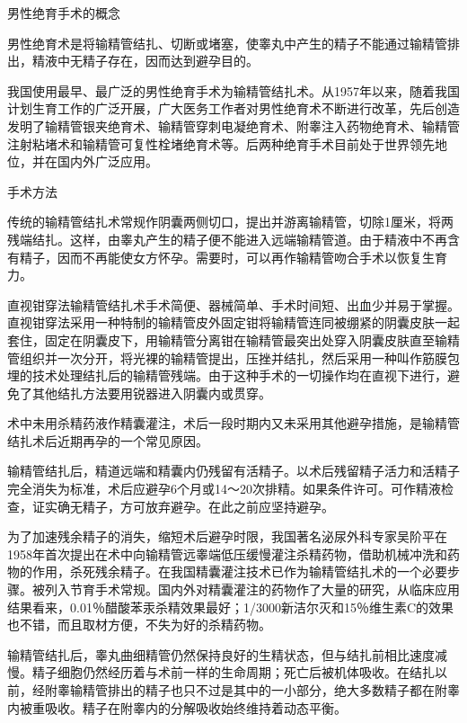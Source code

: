 \documentclass[12pt,UTF8,openany]{ctexbook}
\begin{document}
男性绝育手术的概念


男性绝育术是将输精管结扎、切断或堵塞，使睾丸中产生的精子不能通过输精管排出，精液中无精子存在，因而达到避孕目的。

我国使用最早、最广泛的男性绝育手术为输精管结扎术。从1957年以来，随着我国计划生育工作的广泛开展，广大医务工作者对男性绝育术不断进行改革，先后创造发明了输精管银夹绝育术、输精管穿刺电凝绝育术、附睾注入药物绝育术、输精管注射粘堵术和输精管可复性栓堵绝育术等。后两种绝育手术目前处于世界领先地位，并在国内外广泛应用。





手术方法


传统的输精管结扎术常规作阴囊两侧切口，提出并游离输精管，切除1厘米，将两残端结扎。这样，由睾丸产生的精子便不能进入远端输精管道。由于精液中不再含有精子，因而不再能使女方怀孕。需要时，可以再作输精管吻合手术以恢复生育力。

直视钳穿法输精管结扎术手术简便、器械简单、手术时间短、出血少并易于掌握。直视钳穿法采用一种特制的输精管皮外固定钳将输精管连同被绷紧的阴囊皮肤一起套住，固定在阴囊皮下，用输精管分离钳在输精管最突出处穿入阴囊皮肤直至输精管组织并一次分开，将光裸的输精管提出，压挫并结扎，然后采用一种叫作筋膜包埋的技术处理结扎后的输精管残端。由于这种手术的一切操作均在直视下进行，避免了其他结扎方法要用锐器进入阴囊内或贯穿。

术中未用杀精药液作精囊灌注，术后一段时期内又未采用其他避孕措施，是输精管结扎术后近期再孕的一个常见原因。

输精管结扎后，精道远端和精囊内仍残留有活精子。以术后残留精子活力和活精子完全消失为标准，术后应避孕6个月或14～20次排精。如果条件许可。可作精液检查，证实确无精子，方可放弃避孕。在此之前应坚持避孕。

为了加速残余精子的消失，缩短术后避孕时限，我国著名泌尿外科专家吴阶平在1958年首次提出在术中向输精管远睾端低压缓慢灌注杀精药物，借助机械冲洗和药物的作用，杀死残余精子。在我国精囊灌注技术已作为输精管结扎术的一个必要步骤。被列入节育手术常规。国内外对精囊灌注的药物作了大量的研究，从临床应用结果看来，0.01％醋酸苯汞杀精效果最好；1/3000新洁尔灭和15％维生素C的效果也不错，而且取材方便，不失为好的杀精药物。

输精管结扎后，睾丸曲细精管仍然保持良好的生精状态，但与结扎前相比速度减慢。精子细胞仍然经历着与术前一样的生命周期；死亡后被机体吸收。在结扎以前，经附睾输精管排出的精子也只不过是其中的一小部分，绝大多数精子都在附睾内被重吸收。精子在附睾内的分解吸收始终维持着动态平衡。
\end{document}

